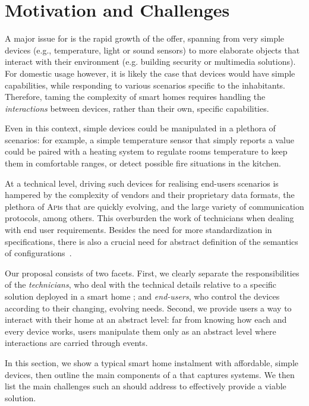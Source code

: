 \section{Motivation and Challenges}
\label{sec:Motivation}

A major issue for \IOT is the rapid growth of the offer, spanning from very simple devices (e.g., temperature, light or sound sensors) to more elaborate objects that interact with their environment (e.g. building security or multimedia solutions). For domestic usage however, it is likely the case that devices would have simple capabilities, while responding to various scenarios specific to the inhabitants. Therefore, taming the complexity of smart homes requires handling the \emph{interactions} between devices, rather than their own, specific capabilities. 

Even in this context, simple devices could be manipulated in a plethora of scenarios: for example, a simple temperature sensor that simply reports a value could be paired with a heating system to regulate rooms temperature to keep them in comfortable ranges, or detect possible fire situations in the kitchen. 

At a technical level, driving such devices for realising end-users scenarios is hampered by the complexity of vendors and their proprietary data formats, the plethora of \textsc{Api}s that are quickly evolving, and the large variety of communication protocols, among others. This overburden the work of \IOT technicians when dealing with end user requirements. Besides the need for more standardization in \IOT specifications, there is also a crucial need for abstract definition of the semantics of \IOT configurations~\cite{park-16}.

Our proposal consists of two facets. First, we clearly separate the responsibilities of the \emph{technicians}, who deal with the technical details relative to a specific solution deployed in a smart home \cite{park-16}; and \emph{end-users}, who control the devices according to their changing, evolving needs. Second, we provide users a way to interact with their home at an abstract level: far from knowing how each and every device works, users manipulate them only as an abstract level where interactions are carried through events.

In this section, we show a typical smart home instalment with affordable, simple devices, then outline the main components of a \DSL that captures \IOT systems. We then list the main challenges such an \IOT \DSL should address to effectively provide a viable solution.

